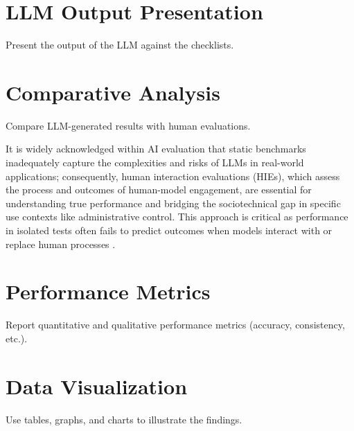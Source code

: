 \documentclass[../main.tex]{subfiles}
\begin{document}
\section{LLM Output Presentation}
Present the output of the LLM against the checklists.

\section{Comparative Analysis}
Compare LLM-generated results with human evaluations.

It is widely acknowledged within AI evaluation that static benchmarks inadequately capture the complexities and risks of LLMs in real-world applications; consequently, human interaction evaluations (HIEs), which assess the process and outcomes of human-model engagement, are essential for understanding true performance and bridging the sociotechnical gap in specific use contexts like administrative control. This approach is critical as performance in isolated tests often fails to predict outcomes when models interact with or replace human processes \cite{ibrahimStaticAIEvaluations2024}.

\section{Performance Metrics}
Report quantitative and qualitative performance metrics (accuracy, consistency, etc.).

\section{Data Visualization}
Use tables, graphs, and charts to illustrate the findings.
\end{document}

